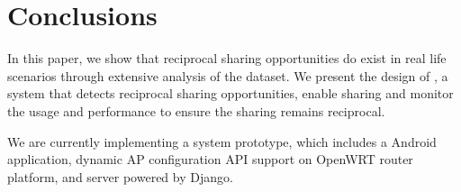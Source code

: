 \section{Conclusions}
\label{sec:conclusion}

In this paper, we show that reciprocal \wifi{} sharing opportunities do exist in
real life scenarios through extensive analysis of the \PhoneLab{} \wifi{}
dataset. We present the design of \wisefi{}, a system that detects
reciprocal sharing opportunities, enable \wifi{} sharing and monitor the \wifi{}
usage and performance to ensure the sharing remains reciprocal.

We are currently implementing a \wisefi{} system prototype, which includes a
\wisefi{} Android application, dynamic AP configuration API support on OpenWRT
router platform, and \wisefi{} server powered by Django.
